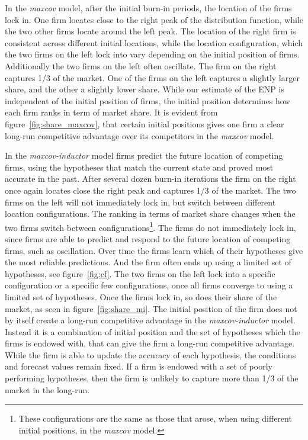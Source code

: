 \documentclass[preprint, 12pt]{elsarticle}
\begin{document}
In the \emph{maxcov} model, after the initial burn-in periods, the location of the firms lock in. One firm locates close to the right peak of the distribution function, while the two other firms locate around the left peak. The location of the right firm is consistent across different initial locations, while the location configuration, which the two firms on the left lock into vary depending on the initial position of firms. Additionally the two firms on the left often oscillate. The firm on the right captures 1/3 of the market. One of the firms on the left captures a slightly larger share, and the other a slightly lower share. While our estimate of the ENP is independent of the initial position of firms, the initial position determines how each firm ranks in term of market share. It is evident from figure~\ref{fig:share_maxcov}, that certain initial positions gives one firm a clear long-run competitive advantage over its competitors in the \emph{maxcov} model. 

In the \emph{maxcov-inductor} model firms predict the future location of competing firms, using the hypotheses that match the current state and proved most accurate in the past. After several dozen burn-in iterations the firm on the right once again locates close the right peak and captures 1/3 of the market. The two firms on the left will not immediately lock in, but switch between different location configurations. The ranking in terms of market share changes when the two firms switch between configurations\footnote{These configurations are the same as those that arose, when using different initial positions, in the \emph{maxcov} model.}. The firms do not immediately lock in, since firms are able to predict and respond to the future location of competing firms, such as oscillation. Over time the firms learn which of their hypotheses give the most reliable predictions. And the firm often ends up using a limited set of hypotheses, see figure~\ref{fig:cf}. The two firms on the left lock into a specific configuration or a specific few configurations, once all firms converge to using a limited set of hypotheses. Once the firms lock in, so does their share of the market, as seen in figure~\ref{fig:share_mi}. The initial position of the firm does not by itself create a long-run competitive advantage in the \emph{maxcov-inductor} model. Instead it is a combination of initial position and the set of hypotheses which the firms is endowed with, that can give the firm a long-run competitive advantage. While the firm is able to update the accuracy of each hypothesis, the conditions and forecast values remain fixed. If a firm is endowed with a set of poorly performing hypotheses, then the firm is unlikely to capture more than 1/3 of the market in the long-run. 
\end{document}
